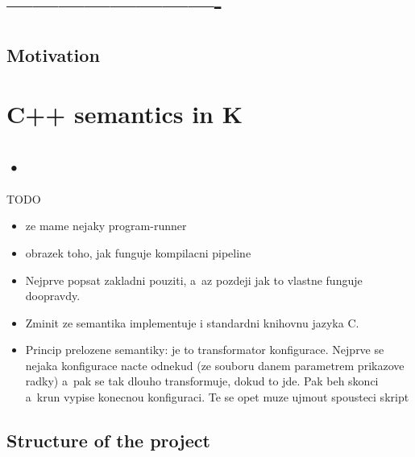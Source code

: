 \documentclass{fithesis3}
\begin{document}
\ifshowoldstuff

\chapter{-------------------------}

\section{Motivation}



\chapter{C++ semantics in K}




\section{•}

TODO
\begin{itemize}
\item ze mame nejaky program-runner
\item obrazek toho, jak funguje kompilacni pipeline
\item Nejprve popsat zakladni pouziti, a~az pozdeji jak to vlastne funguje doopravdy.
\item Zminit ze semantika implementuje i standardni knihovnu jazyka C.
\item Princip prelozene semantiky: je to transformator konfigurace. Nejprve se nejaka konfigurace nacte odnekud (ze souboru danem parametrem prikazove radky) a~pak se tak dlouho transformuje, dokud to jde. Pak beh skonci a~krun vypise konecnou konfiguraci. Te se opet muze ujmout spousteci skript 
\end{itemize}

\section{Structure of the project}
\end{document}
